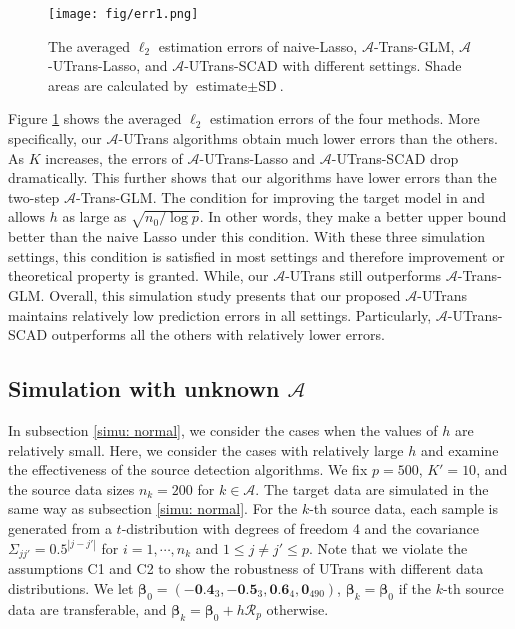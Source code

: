 \documentclass[twoside,12pt]{article}
\newcommand{\mb}[1]{\boldsymbol{\mathbf{#1}}}
\begin{document}
\begin{figure}[hbt!]
	\centering
	\texttt{[image: fig/err1.png]}
	\caption{The averaged $\ell_2$ estimation errors of naive-Lasso, $\mathcal A$-Trans-GLM, $\mathcal A$-UTrans-Lasso, and $\mathcal A$-UTrans-SCAD with different settings. Shade areas are calculated by $\text{estimate}\pm \text{SD}$.}
	\label{fig: err1}
\end{figure}

Figure \ref{fig: err1} shows the averaged $\ell_2$ estimation errors of the four methods.
More specifically, our $\mathcal A$-UTrans algorithms obtain much lower errors than the others.
As $K$ increases, the errors of $\mathcal A$-UTrans-Lasso and $\mathcal A$-UTrans-SCAD drop dramatically.
This further shows that our algorithms have lower errors than the two-step $\mathcal A$-Trans-GLM.
The condition for improving the target model in \citet{Li2022} and \citet{tian2022transfer} allows $h$ as large as $\sqrt{n_0/\log p}$. 
In other words, they make a better upper bound better than the naive Lasso under this condition.
With these three simulation settings, this condition is satisfied in most settings and therefore improvement or theoretical property is granted.
While, our $\mathcal A$-UTrans still outperforms $\mathcal A$-Trans-GLM.
Overall, this simulation study presents that our proposed $\mathcal A$-UTrans maintains relatively low prediction errors in all settings. 
Particularly, $\mathcal A$-UTrans-SCAD outperforms all the others with relatively lower errors.

\subsection{Simulation with unknown $\mathcal A$}
\label{simu: detect}

In subsection \ref{simu: normal}, we consider the cases when the values of $h$ are relatively small.
Here, we consider the cases with relatively large $h$ and examine the effectiveness of the source detection algorithms.
We fix $p=500$, $K'=10$, and the source data sizes $n_k=200$ for $k\in\mathcal A$.
The target data are simulated in the same way as subsection \ref{simu: normal}.
For the $k$-th source data, each sample is generated from a $t$-distribution with degrees of freedom 4 and the covariance $\Sigma_{jj'}=0.5^{|j-j'|}$ for $i=1,\cdots,n_k$ and $1\leq j\neq j'\leq p$.
Note that we violate the assumptions C1 and C2 to show the robustness of UTrans with different data distributions.
We let $\mb\beta_0=(-\textbf{0.4}_3, -\textbf{0.5}_3, \textbf{0.6}_4, \textbf{0}_{490})$, $\mb\beta_k=\mb\beta_0$ if the $k$-th source data are transferable, and $\mb\beta_k=\mb\beta_0+h \mathcal{R}_p$ otherwise.
\end{document}

